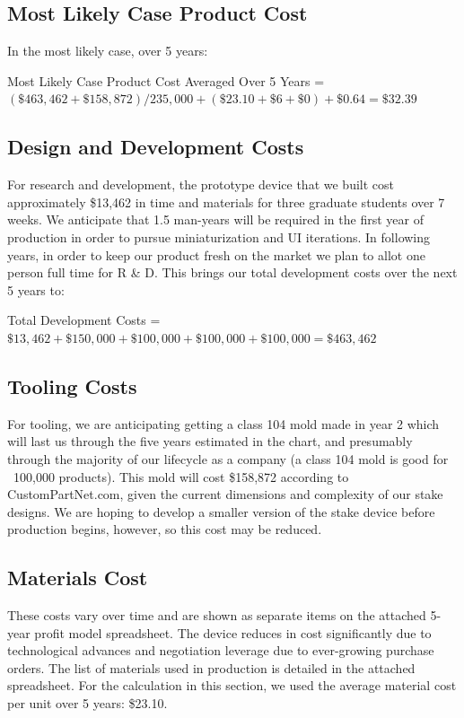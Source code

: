\documentclass[11pt]{article}
\begin{document}
\subsection{Most Likely Case Product Cost}

In the most likely case, over 5 years:

Most Likely Case Product Cost Averaged Over 5 Years = $(\$463,462 + \$158,872)/235,000 + (\$23.10 + \$6 + \$0) + \$0.64 = \$32.39$

\subsection{Design and Development Costs}

For research and development, the prototype device that we built cost approximately \$13,462 in time and materials for three graduate students over 7 weeks.  We anticipate that 1.5 man-years will be required in the first year of production in order to pursue miniaturization and UI iterations.  In following years, in order to keep our product fresh on the market we plan to allot one person full time for R \& D. This brings our total development costs over the next 5 years to:

Total Development Costs = $\$13,462 + \$150,000 + \$100,000 + \$100,000 + \$100,000 = \$463,462$

\subsection{Tooling Costs}

For tooling, we are anticipating getting a class 104 mold made in year 2 which will last us through the five years estimated in the chart, and presumably through the majority of our lifecycle as a company (a class 104 mold is good for ~100,000 products).  This mold will cost \$158,872 according to CustomPartNet.com, given the current dimensions and complexity of our stake designs.  We are hoping to develop a smaller version of the stake device before production begins, however, so this cost may be reduced.

\subsection{Materials Cost}

These costs vary over time and are shown as separate items on the attached 5-year profit model spreadsheet. The device reduces in cost significantly due to technological advances and negotiation leverage due to ever-growing purchase orders. The list of materials used in production is detailed in the attached spreadsheet. For the calculation in this section, we used the average material cost per unit over 5 years: \$23.10.
\end{document}
